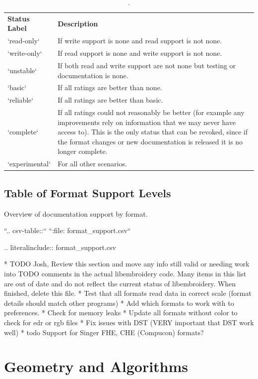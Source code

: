 \documentclass[11pt]{report}
\begin{document}
\begin{table}
\begin{tabular}{l l}
\textbf{Status Label} &
\textbf{Description}
\\
`read-only` &
If write support is none and read support is not none.
\\
`write-only` &
If read support is none and write support is not none.
\\
`unstable` &
If both read and write support are not none but testing or documentation is none.
\\
`basic` &
If all ratings are better than none.
\\
`reliable` &
If all ratings are better than basic.
\\
`complete` &
If all ratings could not reasonably be better (for example any improvements
rely on information that we may never have access to). This is the only status
that can be revoked, since if the format changes or new documentation is
released it is no longer complete.
\\
`experimental` &
For all other scenarios.
\end{tabular}
\caption{.}
\end{table}

\subsection{Table of Format Support Levels}

Overview of documentation support by format.

``.. csv-table::``
``:file: format\_support.csv``

.. literalinclude:: format\_support.csv

* TODO Josh, Review this section and move any info still valid or needing work into TODO comments in the actual libembroidery code. Many items in this list are out of date and do not reflect the current status of libembroidery. When finished, delete this file.
  * Test that all formats read data in correct scale (format details should match other programs)
  * Add which formats to work with to preferences.
  * Check for memory leaks
  * Update all formats without color to check for edr or rgb files
  * Fix issues with DST (VERY important that DST work well)
* todo Support for Singer FHE, CHE (Compucon) formats?

\section{Geometry and Algorithms}
\end{document}
